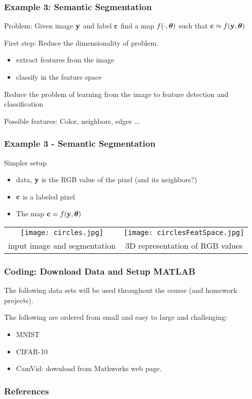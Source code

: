 \documentclass[12pt,fleqn]{beamer}
\begin{document}
\begin{frame}\frametitle{Example 3: Semantic Segmentation}

Problem: Given image ${\bf y}$ and label ${\bf c}$ find a map $f(\cdot,{\boldsymbol \theta})$ such that ${\bf c}  \approx f({\bf y},{\boldsymbol \theta})$ 

\bigskip
\pause

First step: Reduce the dimensionality of problem.
\begin{itemize}
\item extract features from the image
\item classify in the feature space
\end{itemize}

Reduce the problem of learning from the image to feature
detection and classification

\pause
\bigskip

Possible features: Color, neighbors, edges ...

\bigskip


\end{frame}


\begin{frame}\frametitle{Example 3 - Semantic Segmentation}


Simpler setup
\begin{itemize}
\item data, ${\bf y}$ is the RGB value of the pixel (and its neighbors?)  
\item ${\bf c}$ is a labeled pixel
\item The map ${\bf c}  = f({\bf y},{\boldsymbol \theta})$ 
\end{itemize}

\begin{tabular}{cc}
\texttt{[image: circles.jpg]} &
\texttt{[image: circlesFeatSpace.jpg]} \\
input image and segmentation & 3D representation of RGB values \\
\end{tabular}

\end{frame}

\begin{frame}\frametitle{Coding: Download Data and Setup MATLAB}

The following data sets will be used throughout the course (and homework projects).

\bigskip

The following are ordered from small and easy to large and challenging:
\begin{itemize}
	\item MNIST
	\item CIFAR-10
	\item CamVid: download from Mathworks web page. 
\end{itemize}

\end{frame}

\begin{frame}[allowframebreaks]
	\frametitle{References}
 


\end{frame}
\end{document}
